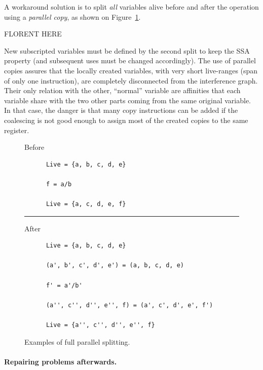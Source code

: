 {A workaround solution is to split \emph{all} variables alive before and 
after the operation using a \emph{parallel copy}, as shown on Figure~\ref{fig:reg-split-all}.

FLORENT HERE

New subscripted variables 
must be defined by the second split to keep the SSA property (and subsequent 
uses must be changed accordingly). The use of parallel copies assures that 
the locally created variables, with very short live-ranges (span of only one 
instruction), are completely disconnected from the interference graph. Their 
only relation with the other, ``normal'' variable are affinities that each 
variable share with the two other parts coming from the same original variable.
In that case, the danger is that many copy instructions can be added if the 
coalescing is not good enough to assign most of the created copies to the same 
register.

\begin{figure}
  \begin{center}
    Before
      \begin{verbatim}
      Live = {a, b, c, d, e}

      f = a/b

      Live = {a, c, d, e, f}

      \end{verbatim}
    \hrule
    After
      \begin{verbatim}
      Live = {a, b, c, d, e}

      (a', b', c', d', e') = (a, b, c, d, e)

      f' = a'/b'

      (a'', c'', d'', e'', f) = (a', c', d', e', f')

      Live = {a'', c'', d'', e'', f}
      \end{verbatim}

  \end{center}
  \caption{Examples of full parallel splitting.}
  \label{fig:reg-split-all}
\end{figure}

\paragraph{Repairing problems afterwards.}

}
